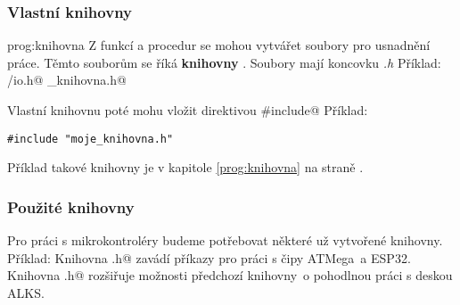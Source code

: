 \subsubsection{Vlastní knihovny} prog:knihovna
Z funkcí a procedur se mohou vytvářet soubory pro usnadnění práce. Těmto souborům se říká \textbf{knihovny} . 
  Soubory mají koncovku \textit{.h}
Příklad: \verb@avr/io.h@
\verb@moje_knihovna.h@

Vlastní knihovnu poté mohu vložit direktivou \verb@#include@
Příklad:
\begin{verbatim}
#include "moje_knihovna.h"
\end{verbatim} 

Příklad takové knihovny je v kapitole \ref{prog:knihovna} na straně \pageref{prog:knihovna}.

\subsubsection{Použité knihovny}  

Pro práci s mikrokontroléry budeme potřebovat některé už vytvořené knihovny.
Příklad: 
Knihovna \verb@Arduino.h@ zavádí příkazy pro práci s čipy ATMega~a ESP32.
Knihovna \verb@Learningkit.h@  rozšiřuje možnosti předchozí knihovny~o pohodlnou práci s deskou ALKS.


 

